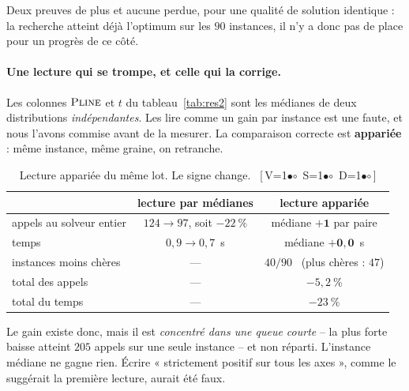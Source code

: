 \documentclass[11pt,a4paper]{article}
\theoremstyle{plain}
\theoremstyle{remark}
\newcommand{\ILP}{\textsc{Pline}}
\newcommand{\cfgm}[1]{\ifnum#1=1$\bullet$\else$\circ$\fi}
\newcommand{\conf}[3]{%
  \textsf{\footnotesize[\,V\cfgm{#1}\ S\cfgm{#2}\ D\cfgm{#3}\,]}}
\begin{document}
\noindent
Deux preuves de plus et aucune perdue, pour une qualité de solution
identique : la recherche atteint déjà l'optimum sur les $90$ instances, il
n'y a donc pas de place pour un progrès de ce côté.

\paragraph{Une lecture qui se trompe, et celle qui la corrige.} Les colonnes
$\ILP$ et $t$ du tableau~\ref{tab:res2} sont les médianes de deux
distributions \emph{indépendantes}. Les lire comme un gain par instance est
une faute, et nous l'avons commise avant de la mesurer. La comparaison
correcte est \textbf{appariée} : même instance, même graine, on retranche.

\begin{table}[H]
\centering
\caption{Lecture appariée du même lot. Le signe change.\ \conf{0}{0}{0}}
\label{tab:apparie}
\begin{tabular}{lcc}
\toprule
& lecture par médianes & lecture \textbf{appariée}\\
\midrule
appels au solveur entier & $124\to 97$, soit $-22\ \%$
                         & médiane $\mathbf{+1}$ par paire\\
temps                    & $0{,}9\to 0{,}7$~s
                         & médiane $\mathbf{+0{,}0}$~s\\
instances moins chères   & --- & $40/90$ \ (plus chères : $47$)\\
total des appels         & --- & $-5{,}2\ \%$\\
total du temps           & --- & $-23\ \%$\\
\bottomrule
\end{tabular}
\end{table}

\noindent
Le gain existe donc, mais il est \emph{concentré dans une queue courte} --
la plus forte baisse atteint $205$ appels sur une seule instance -- et non
réparti. L'instance médiane ne gagne rien. Écrire « strictement positif sur
tous les axes », comme le suggérait la première lecture, aurait été faux.
\end{document}
